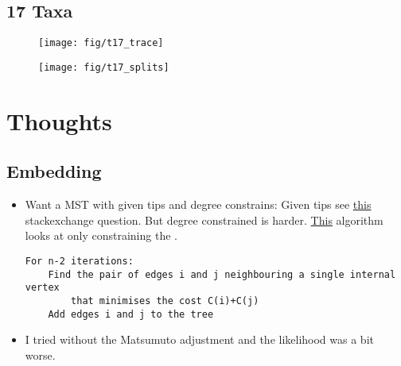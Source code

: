 \documentclass[11pt]{article}
\begin{document}
\clearpage
\subsection{17 Taxa}
\begin{figure}[htbp]
\begin{center}
\texttt{[image: fig/t17\_trace]}
\end{center}
\end{figure}
\begin{figure}[htbp]
\begin{center}
\texttt{[image: fig/t17\_splits]}
\end{center}
\end{figure}


\clearpage
\section{Thoughts}
\subsection{Embedding}
\begin{itemize}
\item Want a MST with given tips and degree constrains:
Given tips see \href{https://cs. stackexchange.com/questions/40131/spanning-tree-with-chosen-leaves?rq=1}{this} stackexchange question.
But degree constrained is harder. 
\href{https://cs.stackexchange.com/questions/22775/minimal-spanning-tree-with-degree-constraint}{This} algorithm looks at only constraining the .

\begin{verbatim}
For n-2 iterations:
    Find the pair of edges i and j neighbouring a single internal vertex
    	that minimises the cost C(i)+C(j)
    Add edges i and j to the tree
\end{verbatim}
\item I tried without the Matsumuto adjustment and the likelihood was a bit worse.
\end{itemize}
\end{document}
